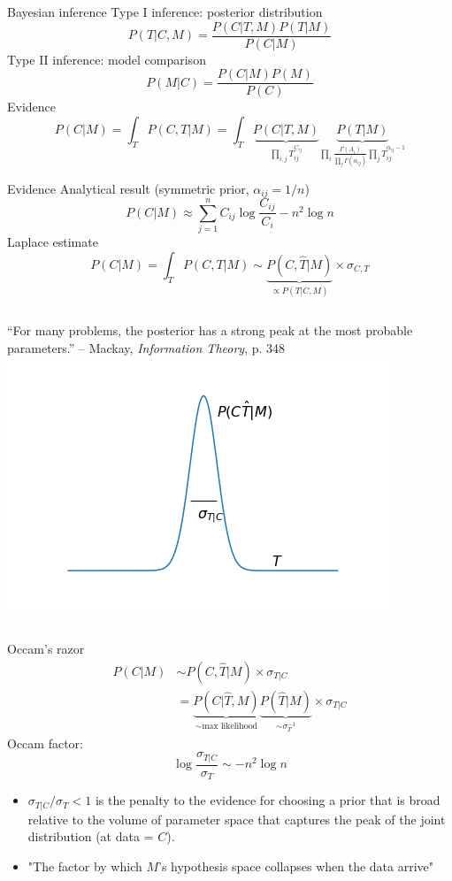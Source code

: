 \documentclass{beamer}
\begin{document}
\begin{frame}{Bayesian inference}
Type I inference: posterior distribution
\[ P(T|C,M) = \frac{P(C|T,M)P(T|M)}{P(C|M)} \]
Type II inference: model comparison
\[ P(M|C) = \frac{P(C|M) P(M)}{P(C)} \]
Evidence
\[ P(C|M) = \int_T P(C,T|M)
= \int_T \underbrace{P(C|T,M)}_{\prod_{i,j}T_{ij}^{C_{ij}}}
\underbrace{P(T|M)}_{\prod_i\frac{\Gamma(A_i)}{\prod_j\Gamma(\alpha_{ij})}\prod_j T_{ij}^{\alpha_{ij}-1}} \]
\end{frame}

\begin{frame}{Evidence}
Analytical result (symmetric prior, $\alpha_{ij}=1/n$)
\[ P(C|M) \approx \sum_{j=1}^n C_{ij}\log\frac{C_{ij}}{C_i} -n^2\log n \]
Laplace estimate
\[ P(C|M) = \int_T P(C,T|M) \sim
\underbrace{P(C, \hat{T}|M)}_{\propto P(T|C,M)} \times \sigma_{C,T} \]
\begin{columns}[T,onlytextwidth]
{\small ``For many problems, the posterior has a strong peak at the most probable
parameters.'' -- Mackay, \emph{Information Theory}, p. 348}
\includegraphics[width=\textwidth]{figures/PCT-dist.png}
\end{columns}
\end{frame}

\begin{frame}{Occam's razor}
\begin{align*}
P(C|M) &\sim P(C, \hat{T}|M) \times \sigma_{T|C} \\
&= \underbrace{P(C|\hat{T},M)}_{\sim\textrm{max likelihood}}
\underbrace{P(\hat{T}|M)}_{\sim \sigma_T^{-1}}
\times\sigma_{T|C}
\end{align*}
Occam factor:
\[ \log\frac{\sigma_{T|C}}{\sigma_T} \sim -n^2\log n \]
\begin{itemize}
    \item $\sigma_{T|C}/\sigma_T < 1$ is the penalty to the evidence for
    choosing a prior that is broad relative to the volume of parameter space
    that captures the peak of the joint distribution (at data = $C$).
    \item "The factor by which $M$'s hypothesis space collapses when the
    data arrive"
\end{itemize}
\end{frame}
\end{document}

